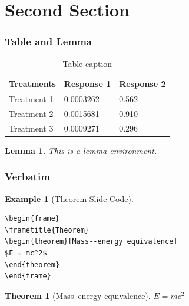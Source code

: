 \documentclass[notheorems,11pt,xcolor=table]{beamer}
\newtheorem{theorem}{Theorem}
\numberwithin{theorem}{section}
\numberwithin{definition}{section}
\newtheorem{lemma}{Lemma}
\numberwithin{lemma}{section}
\theoremstyle{example}
\newtheorem{example}{Example}
\numberwithin{figure}{section}
\numberwithin{table}{section}
\numberwithin{equation}{section}
\begin{document}
\section{Second Section}

\begin{frame}
\frametitle{Table and Lemma}
\begin{table}
\caption{Table caption}
\begin{tabular}{l l l}
\toprule
Treatments & Response 1 & Response 2 \\
\midrule
Treatment 1 & 0.0003262 & 0.562 \\
Treatment 2 & 0.0015681 & 0.910 \\
Treatment 3 & 0.0009271 & 0.296 \\
\bottomrule
\end{tabular}
\end{table}

\begin{lemma}
This is a lemma environment.
\end{lemma}
\end{frame}




\begin{frame}[fragile] %
\frametitle{Verbatim}
\begin{example}[Theorem Slide Code]
\begin{verbatim}
\begin{frame}
\frametitle{Theorem}
\begin{theorem}[Mass--energy equivalence]
$E = mc^2$
\end{theorem}
\end{frame}\end{verbatim}
\end{example}

\begin{theorem}[Mass--energy equivalence]
$E = mc^2$
\end{theorem}
\end{frame}

\end{document}
